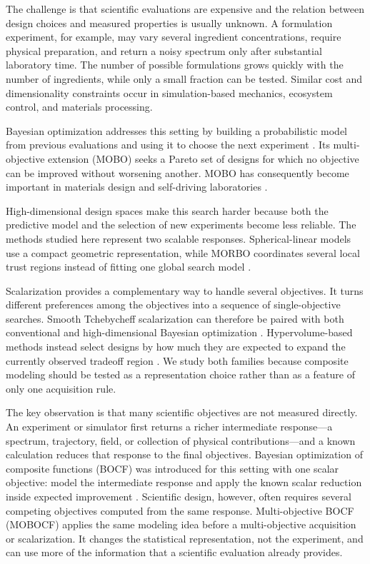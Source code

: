 \documentclass{article}
\begin{document}
The challenge is that scientific evaluations are expensive and the relation
between design choices and measured properties is usually unknown.  A
formulation experiment, for example, may vary several ingredient
concentrations, require physical preparation, and return a noisy spectrum only
after substantial laboratory time.  The number of possible formulations grows
quickly with the number of ingredients, while only a small fraction can be
tested.  Similar cost and dimensionality constraints occur in simulation-based
mechanics, ecosystem control, and materials processing.

Bayesian optimization addresses this setting by building a probabilistic model
from previous evaluations and using it to choose the next experiment
\cite{shahriari2016taking,frazier2018tutorial}.  Its multi-objective extension
(MOBO) seeks a Pareto set of designs for which no objective can be improved
without worsening another.  MOBO has consequently become important in
materials design and self-driving laboratories
\cite{gopakumar2018multiobjective,low2024constrained,macleod2022selfdriving}.

High-dimensional design spaces make this search harder because both the
predictive model and the selection of new experiments become less reliable.
The methods studied here represent two scalable responses.  Spherical-linear
models use a compact geometric representation, while MORBO coordinates several
local trust regions instead of fitting one global search model
\cite{doumont2026linear,daulton2022morbo}.

Scalarization provides a complementary way to handle several objectives.  It
turns different preferences among the objectives into a sequence of
single-objective searches.  Smooth Tchebycheff scalarization can therefore be
paired with both conventional and high-dimensional Bayesian optimization
\cite{lin2024smooth}.  Hypervolume-based methods instead select designs by how
much they are expected to expand the currently observed tradeoff region
\cite{daulton2020differentiable,ament2023unexpected}.  We study both families
because composite modeling should be tested as a representation choice rather
than as a feature of only one acquisition rule.

The key observation is that many scientific objectives are not measured
directly.  An experiment or simulator first returns a richer intermediate
response---a spectrum, trajectory, field, or collection of physical
contributions---and a known calculation reduces that response to the final
objectives.  Bayesian optimization of composite functions (BOCF) was introduced
for this setting with one scalar objective: model the intermediate response and
apply the known scalar reduction inside expected improvement
\cite{astudillo2019bayesian}.  Scientific design, however, often requires
several competing objectives computed from the same response.  Multi-objective
BOCF (MOBOCF) applies the same modeling idea before a multi-objective
acquisition or scalarization.  It changes the statistical representation, not
the experiment, and can use more of the information that a scientific
evaluation already provides.
\end{document}
